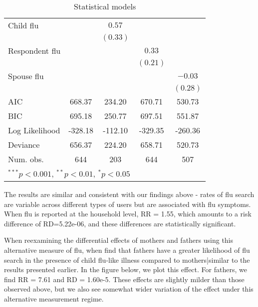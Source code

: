 \documentclass[12pt]{article}
\begin{document}
\begin{table}[h!]
\begin{center}
\begin{tabular}{l c c c c }
Child flu         &                & $0.57$         &                &                \\
               &                & $(0.33)$       &                &                \\
Respondent flu          &                &                & $0.33$         &                \\
               &                &                & $(0.21)$       &                \\
Spouse flu          &                &                &                & $-0.03$        \\
               &                &                &                & $(0.28)$       \\
\hline
AIC            & 668.37         & 234.20         & 670.71         & 530.73         \\
BIC            & 695.18         & 250.77         & 697.51         & 551.87         \\
Log Likelihood & -328.18        & -112.10        & -329.35        & -260.36        \\
Deviance       & 656.37         & 224.20         & 658.71         & 520.73         \\
Num. obs.      & 644            & 203            & 644            & 507            \\
\hline
\multicolumn{5}{l}{\scriptsize{$^{***}p<0.001$, $^{**}p<0.01$, $^*p<0.05$}}
\end{tabular}
\caption{Statistical models}
\label{table:coefficients}
\end{center}
\end{table}

The results are similar and consistent with our findings above - rates of flu search are variable across different types of users but are associated with flu symptoms. When flu is reported at the household level, RR = 1.55, which amounts to a risk difference of RD=5.22e-06, and these differences are statistically significant.   

When reexamining the differential effects of mothers and fathers using this alternative measure of flu, when find that fathers have a greater likelihood of flu search in the presence of child flu-like illness compared to mothers|similar to the results presented earlier. In the figure below, we plot this effect. For fathers, we find RR = 7.61 and RD = 1.60e-5. These effects are slightly milder than those observed above, but we also see somewhat wider variation of the effect under this alternative measurement regime. %
\end{document}
